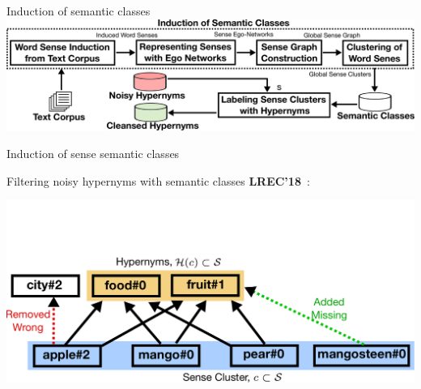 %
%
%
%
%
%	



\begin{frame}{Induction of  semantic classes}
	\includegraphics[width=1.0\textwidth]{figures/outline-semantic-classes}
\end{frame}




\begin{frame}{Induction of sense semantic classes}

Filtering noisy hypernyms with semantic classes \textbf{LREC'18}~\cite{panchenko:2018:SemanticClasses}: 

	\centering \includegraphics[width=1.0\textwidth]{figures/coset}
	
\end{frame}



